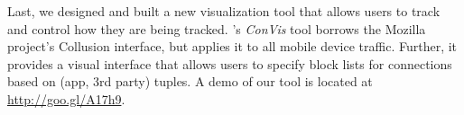 Last, we designed and built a new visualization tool that allows users to track and control how 
they are being tracked. \platname{}'s \emph{ConVis} tool borrows the Mozilla project's Collusion 
interface, but applies it to all mobile device traffic. Further, it provides a visual interface that allows 
 users to specify block lists for connections based on (app, 3rd party) tuples. A demo of our tool is 
 located at \url{http://goo.gl/A17h9}.


%



